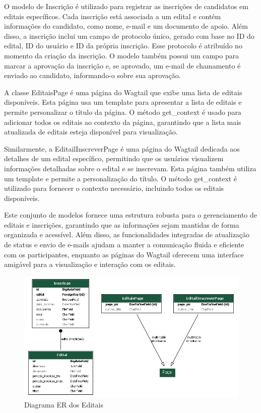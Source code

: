 O modelo de Inscrição é utilizado para registrar as inscrições de candidatos em editais específicos. Cada inscrição está associada a um edital e contém informações do candidato, como nome, e-mail e um documento de apoio. Além disso, a inscrição inclui um campo de protocolo único, gerado com base no ID do edital, ID do usuário e ID da própria inscrição. Esse protocolo é atribuído no momento da criação da inscrição. O modelo também possui um campo para marcar a aprovação da inscrição e, se aprovado, um e-mail de chamamento é enviado ao candidato, informando-o sobre sua aprovação.

A classe EditaisPage é uma página do Wagtail que exibe uma lista de editais disponíveis. Esta página usa um template para apresentar a lista de editais e permite personalizar o título da página. O método get\_context é usado para adicionar todos os editais ao contexto da página, garantindo que a lista mais atualizada de editais esteja disponível para visualização.

Similarmente, a EditailInscreverPage é uma página do Wagtail dedicada aos detalhes de um edital específico, permitindo que os usuários visualizem informações detalhadas sobre o edital e se inscrevam. Esta página também utiliza um template e permite a personalização do título. O método get\_context é utilizado para fornecer o contexto necessário, incluindo todos os editais disponíveis.

Este conjunto de modelos fornece uma estrutura robusta para o gerenciamento de editais e inscrições, garantindo que as informações sejam mantidas de forma organizada e acessível. Além disso, as funcionalidades integradas de atualização de status e envio de e-mails ajudam a manter a comunicação fluida e eficiente com os participantes, enquanto as páginas do Wagtail oferecem uma interface amigável para a visualização e interação com os editais.

\begin{figure}[htb]
	\centering
	 \begin{minipage}{0.4\textwidth}
	   \centering
	   \caption{Diagrama ER dos Editais} \label{er_diagram_editais}
	   \includegraphics[scale=0.5]{./img/er_diagram_editais.png}
	 \end{minipage}
   \end{figure}


